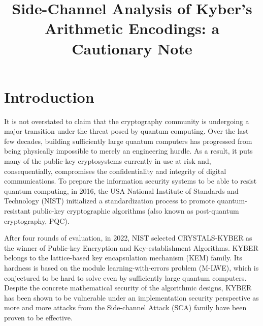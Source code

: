 \documentclass{llncs}
\begin{document}
 
	
	\title{Side-Channel Analysis of Kyber's	Arithmetic Encodings: a Cautionary Note}
	\maketitle
	
	\begin{abstract}
		
	\end{abstract}
	
	
	\section{Introduction}
	
	It is not overstated to claim that the cryptography community is undergoing a major transition under the threat posed by quantum computing. Over the last few decades, building sufficiently large quantum computers has progressed from being physically impossible to merely an engineering hurdle. As a result, it puts many of the public-key cryptosystems currently in use at risk and, consequentially, compromises the confidentiality and integrity of digital communications. To prepare the information security systems to be able to resist quantum computing, in 2016, the USA National Institute of Standards and Technology (NIST) initialized a standardization process to promote quantum-resistant public-key cryptographic algorithms (also known as post-quantum cryptography, PQC). 
	
	After four rounds of evaluation, in 2022, NIST selected CRYSTALS-KYBER \cite{kyber} as the winner of Public-key Encryption and Key-establishment Algorithms. KYBER belongs to the lattice-based key encapsulation mechanism (KEM) family. Its hardness is based on the module learning-with-errors problem (M-LWE), which is conjectured to be hard to solve even by sufficiently large quantum computers. Despite the concrete mathematical security of the algorithmic designs, KYBER has been shown to be vulnerable under an implementation security perspective as more and more attacks from the Side-channel Attack (SCA) family have been proven to be effective. 
	
\end{document}
